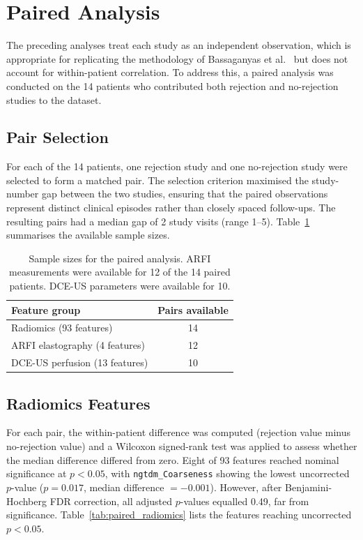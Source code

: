 \section{Paired Analysis}
\label{sec:paired_results}

The preceding analyses treat each study as an independent observation, which is appropriate for replicating the methodology of Bassaganyas et al.\ \cite{bassaganyas2025} but does not account for within-patient correlation. To address this, a paired analysis was conducted on the 14 patients who contributed both rejection and no-rejection studies to the dataset.

\subsection{Pair Selection}

For each of the 14 patients, one rejection study and one no-rejection study were selected to form a matched pair. The selection criterion maximised the study-number gap between the two studies, ensuring that the paired observations represent distinct clinical episodes rather than closely spaced follow-ups. The resulting pairs had a median gap of 2 study visits (range 1--5). Table~\ref{tab:paired_summary} summarises the available sample sizes.

\begin{table}[ht]
\centering
\caption{Sample sizes for the paired analysis. ARFI measurements were available for 12 of the 14 paired patients. DCE-US parameters were available for 10.}
\label{tab:paired_summary}
\begin{tabular}{lc}
\toprule
Feature group & Pairs available \\
\midrule
Radiomics (93 features) & 14 \\
ARFI elastography (4 features) & 12 \\
DCE-US perfusion (13 features) & 10 \\
\bottomrule
\end{tabular}
\end{table}

\subsection{Radiomics Features}

For each pair, the within-patient difference was computed (rejection value minus no-rejection value) and a Wilcoxon signed-rank test was applied to assess whether the median difference differed from zero. Eight of 93 features reached nominal significance at $p < 0.05$, with \texttt{ngtdm\_Coarseness} showing the lowest uncorrected $p$-value ($p = 0.017$, median difference $= -0.001$). However, after Benjamini-Hochberg FDR correction, all adjusted $p$-values equalled 0.49, far from significance. Table~\ref{tab:paired_radiomics} lists the features reaching uncorrected $p < 0.05$.

